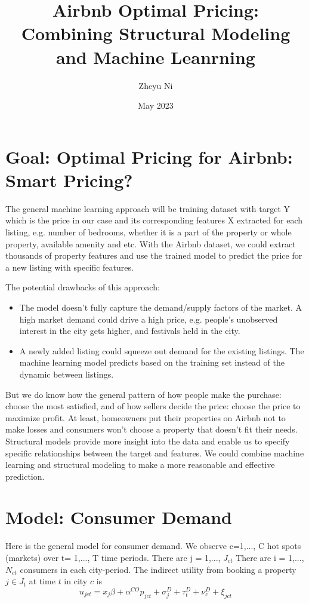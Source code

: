 \documentclass{article}
\title{Airbnb Optimal Pricing: Combining Structural Modeling and Machine Leanrning}
\author{Zheyu Ni}
\date{May 2023}
\begin{document}
\maketitle

\section{Goal: Optimal Pricing for Airbnb: Smart Pricing?}


The general machine learning approach will be training dataset with target Y which is the price in our case and its corresponding features X extracted for each listing, e.g. number of bedrooms, whether it is a part of the property or whole property, available amenity and etc. With the Airbnb dataset, we could extract thousands of property
features and use the trained model to predict the price for a new listing with specific features.  

The potential drawbacks of this approach:  

\begin{itemize}
    \item The model doesn't fully capture the demand/supply factors of the market. A high market demand could drive a high price, e.g. people's unobserved interest in the city gets higher, and festivals held in the city. 
    \item A newly added listing could squeeze out demand for the existing listings. The machine learning model predicts based on the training set instead of the dynamic between listings. 

    
\end{itemize}
But we do know how the general pattern of how people make the purchase: choose the most satisfied, and of how sellers decide the price: choose the price to maximize profit. At least, homeowners put their properties on Airbnb not to make losses and consumers won't choose a property that doesn't fit their needs. Structural models provide more insight into the data and enable us to specify specific relationships between the target and features. We could combine machine learning and structural modeling to make a more reasonable and effective prediction. 

\section{Model: Consumer Demand}
Here is the general model for consumer demand. We observe c=1,..., C hot spots (markets) over t= 1,..., T time periods. There are j = 1,..., $J_{ct}$ There are i = 1,..., $N_{ct}$ consumers in each city-period.  The indirect utility from booking a property $j\in J_t$  at time $t$ in city $c$ is 
$$u_{jct}=x_j\beta+\alpha^{CO} p_{jct}+\sigma_j^D+\tau_t^D+\nu_c^D+\xi_{jct}$$ 
\end{document}
